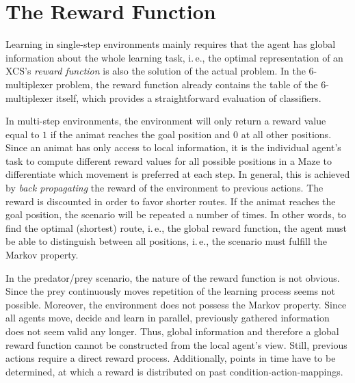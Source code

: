 \section{The Reward Function}
\label{section:the-reward-function}

Learning in single-step environments mainly requires that the agent has global information about the whole learning task, i.\,e., the optimal representation of an XCS's \emph{reward function} is also the solution of the actual problem. In the 6-multiplexer problem, the reward function already contains the table of the 6-multiplexer itself, which provides a straightforward evaluation of classifiers.

In multi-step environments, the environment will only return a reward value equal to $1$ if the animat reaches the goal position 
and $0$
at all other positions. 
Since an animat has only access to local information, it is the individual agent's task to compute different reward values for all possible positions in a Maze to differentiate which movement is preferred at each step. In general, this is achieved by \emph{back propagating} the reward of the environment to previous actions. The reward is discounted in order to favor shorter routes. If the animat reaches the goal position, the scenario will be repeated a number of times. In other words, to find the optimal (shortest) route, i.\,e., the global reward function, the agent must be able to distinguish between all positions, i.\,e., the scenario must fulfill the Markov property.

In the predator/prey scenario, the nature of the reward function is not obvious. Since the prey continuously moves
repetition of the learning process seems not possible. 
Moreover, the environment does not possess the Markov property. Since all agents move, decide and learn in parallel, previously gathered information does not seem valid any longer.
Thus, global information and therefore a global reward function cannot be constructed from the local agent's view. Still, previous actions require a direct reward process. Additionally, points in time have to be determined, at which a reward is distributed on past condition-action-mappings.

